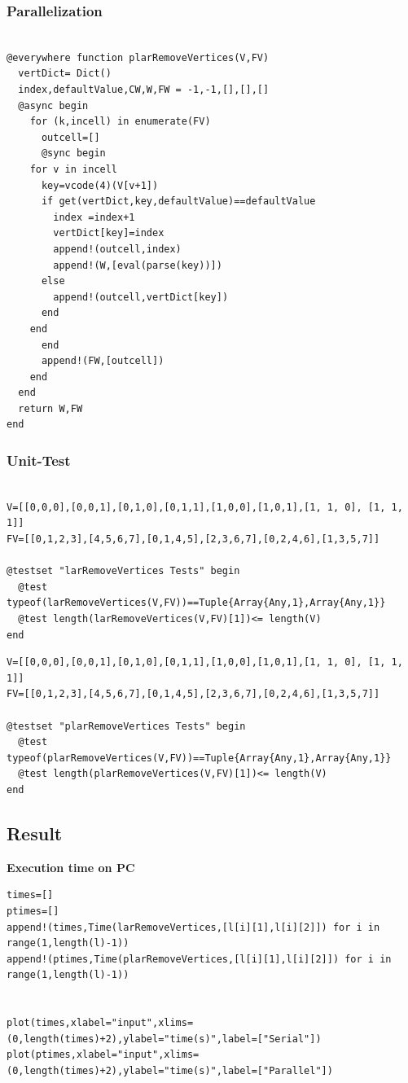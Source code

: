 \documentclass[a4paper,12pt]{article}
\begin{document}
\subsubsection{Parallelization}
\begin{Verbatim}[fontsize=\scriptsize]

@everywhere function plarRemoveVertices(V,FV)
  vertDict= Dict()
  index,defaultValue,CW,W,FW = -1,-1,[],[],[]
  @async begin
    for (k,incell) in enumerate(FV)
      outcell=[]
      @sync begin
	for v in incell
	  key=vcode(4)(V[v+1])
	  if get(vertDict,key,defaultValue)==defaultValue
	    index =index+1
	    vertDict[key]=index
	    append!(outcell,index)
	    append!(W,[eval(parse(key))])
	  else
	    append!(outcell,vertDict[key])
	  end
	end
      end
      append!(FW,[outcell])
    end
  end
  return W,FW
end

\end{Verbatim}

\subsubsection{Unit-Test}
\noindent{}
\begin{Verbatim}[fontsize=\footnotesize]

V=[[0,0,0],[0,0,1],[0,1,0],[0,1,1],[1,0,0],[1,0,1],[1, 1, 0], [1, 1, 1]]
FV=[[0,1,2,3],[4,5,6,7],[0,1,4,5],[2,3,6,7],[0,2,4,6],[1,3,5,7]]

@testset "larRemoveVertices Tests" begin
  @test typeof(larRemoveVertices(V,FV))==Tuple{Array{Any,1},Array{Any,1}}
  @test length(larRemoveVertices(V,FV)[1])<= length(V)
end

\end{Verbatim}
\begin{Verbatim}[fontsize=\footnotesize]
V=[[0,0,0],[0,0,1],[0,1,0],[0,1,1],[1,0,0],[1,0,1],[1, 1, 0], [1, 1, 1]]
FV=[[0,1,2,3],[4,5,6,7],[0,1,4,5],[2,3,6,7],[0,2,4,6],[1,3,5,7]]

@testset "plarRemoveVertices Tests" begin
  @test typeof(plarRemoveVertices(V,FV))==Tuple{Array{Any,1},Array{Any,1}}
  @test length(plarRemoveVertices(V,FV)[1])<= length(V)
end
\end{Verbatim}

\subsection{Result}
\textbf{Execution time on PC}
\begin{Verbatim}[fontsize=\footnotesize]
times=[]
ptimes=[]
append!(times,Time(larRemoveVertices,[l[i][1],l[i][2]]) for i in range(1,length(l)-1))
append!(ptimes,Time(plarRemoveVertices,[l[i][1],l[i][2]]) for i in range(1,length(l)-1))


plot(times,xlabel="input",xlims=(0,length(times)+2),ylabel="time(s)",label=["Serial"])
plot(ptimes,xlabel="input",xlims=(0,length(times)+2),ylabel="time(s)",label=["Parallel"])
\end{Verbatim}
\end{document}
